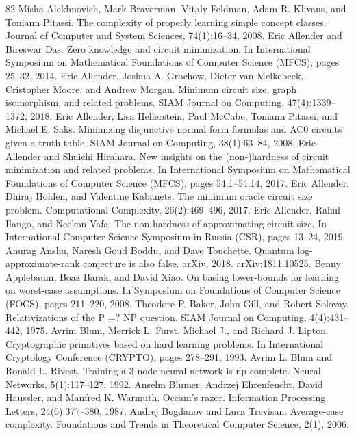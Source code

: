 \begin{thebibliography}{82}
Misha Alekhnovich, Mark Braverman, Vitaly Feldman, Adam R. Klivans, and Toniann Pitassi. The complexity of properly learning simple concept classes. Journal of Computer and System Sciences, 74(1):16–34, 2008.
Eric Allender and Bireswar Das. Zero knowledge and circuit minimization. In International Symposium on Mathematical Foundations of Computer Science (MFCS), pages 25–32, 2014.
Eric Allender, Joshua A. Grochow, Dieter van Melkebeek, Cristopher Moore, and Andrew Morgan. Minimum circuit size, graph isomorphism, and related problems. SIAM Journal on Computing, 47(4):1339–1372, 2018.
Eric Allender, Lisa Hellerstein, Paul McCabe, Toniann Pitassi, and Michael E. Saks. Minimizing disjunctive normal form formulas and AC0 circuits given a truth table. SIAM Journal on Computing, 38(1):63–84, 2008.
Eric Allender and Shuichi Hirahara. New insights on the (non-)hardness of circuit minimization and related problems. In International Symposium on Mathematical Foundations of Computer Science (MFCS), pages 54:1–54:14, 2017.
Eric Allender, Dhiraj Holden, and Valentine Kabanets. The minimum oracle circuit size problem. Computational Complexity, 26(2):469–496, 2017.
Eric Allender, Rahul Ilango, and Neekon Vafa. The non-hardness of approximating circuit size. In International Computer Science Symposium in Russia (CSR), pages 13–24, 2019.
Anurag Anshu, Naresh Goud Boddu, and Dave Touchette. Quantum log-approximate-rank conjecture is also false. arXiv, 2018. arXiv:1811.10525.
Benny Applebaum, Boaz Barak, and David Xiao. On basing lower-bounds for learning on worst-case assumptions. In Symposium on Foundations of Computer Science (FOCS), pages 211–220, 2008.
Theodore P. Baker, John Gill, and Robert Solovay. Relativizations of the P =? NP question. SIAM Journal on Computing, 4(4):431–442, 1975.
Avrim Blum, Merrick L. Furst, Michael J., and Richard J. Lipton. Cryptographic primitives based on hard learning problems. In International Cryptology Conference (CRYPTO), pages 278–291, 1993.
Avrim L. Blum and Ronald L. Rivest. Training a 3-node neural network is np-complete. Neural Networks, 5(1):117–127, 1992.
Anselm Blumer, Andrzej Ehrenfeucht, David Haussler, and Manfred K. Warmuth. Occam’s razor. Information Processing Letters, 24(6):377–380, 1987.
Andrej Bogdanov and Luca Trevisan. Average-case complexity. Foundations and Trends in Theoretical Computer Science, 2(1), 2006.

\end{thebibliography}
